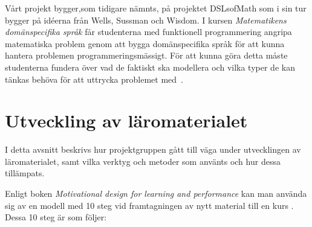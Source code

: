 \documentclass[12pt,a4paper,twoside,openright]{article}
\begin{document}
Vårt projekt bygger,som tidigare nämnts, på projektet DSLsofMath som i
sin tur bygger på idéerna från Wells, Sussman och Wisdom.  I kursen
\textit{Matematikens domänspecifika språk} får studenterna med
funktionell programmering angripa matematiska problem genom att bygga
domänspecifika språk för att kunna hantera problemen
programmeringsmässigt. För att kunna göra detta måste studenterna
fundera över vad de faktiskt ska modellera och vilka typer de kan
tänkas behöva för att uttrycka problemet
med~\cite{kursplan:dslsofmath}.

\newpage

\section{Utveckling av läromaterialet}
\label{sec:utveckling}



I detta avsnitt beskrivs hur projektgruppen gått till väga under
utvecklingen av läromaterialet, samt vilka verktyg och metoder som
använts och hur dessa tillämpats.

Enligt boken \textit{Motivational design for learning and performance}
kan man använda sig av en modell med 10 steg vid framtagningen av nytt
material till en kurs \cite{motivational_design}. Dessa 10 steg är som
följer:
\end{document}
